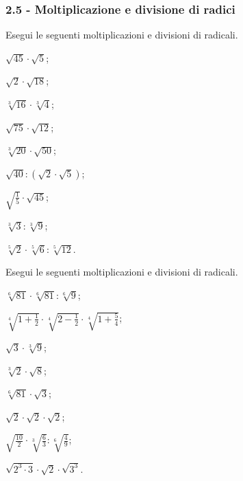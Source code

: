 \subsubsection*{2.5 - Moltiplicazione e divisione di radici}
\begin{esercizio}[\Ast]
 \label{ese:2.32}
Esegui le seguenti moltiplicazioni e divisioni di radicali.
 \begin{multicols}{3}
 \begin{enumeratea}
 \item $\sqrt{45}\cdot \sqrt 5$;
 \item $\sqrt 2\cdot \sqrt{18}$;
 \item $\sqrt[3]{16}\cdot \sqrt[3]4$;
 \item $\sqrt{75}\cdot \sqrt{12}$;
 \item $\sqrt[3]{20}\cdot \sqrt{50}$;
 \item $\sqrt{40}:\left(\sqrt 2\cdot \sqrt 5\right)$;
 \item $\sqrt{\frac 1 5}\cdot \sqrt{45}$;
 \item $\sqrt[3]3:\sqrt[3]9$;
 \item $\sqrt[5]2\cdot \sqrt[5]6:\sqrt[5]{12}$.
 \end{enumeratea}
 \end{multicols}
\end{esercizio}
\newpage
\begin{esercizio}[\Ast]
 \label{ese:2.33}
Esegui le seguenti moltiplicazioni e divisioni di radicali.
 \begin{multicols}{2}
 \begin{enumeratea}
 \item $\sqrt[6]{81}\cdot \sqrt[6]{81}:\sqrt[6]9$;
 \item $\sqrt[4]{1+\frac 1 2}\cdot \sqrt[4]{2-\frac 1 2}\cdot \sqrt[4]{1+\frac 5 4}$;
 \item $\sqrt 3\cdot \sqrt[3]9$;
 \item $\sqrt[3]2\cdot \sqrt 8$;
 \item $\sqrt[6]{81}\cdot \sqrt 3$;
 \item $\sqrt 2\cdot \sqrt 2\cdot\sqrt 2$;
 \item $\sqrt{\frac{10} 2}\cdot \sqrt[3]{\frac 6 3}:\sqrt[6]{\frac 4 9}$;
 \item $\sqrt{2^3\cdot 3}\cdot \sqrt 2\cdot \sqrt{3^3}$.
 \end{enumeratea}
 \end{multicols}
\end{esercizio}


